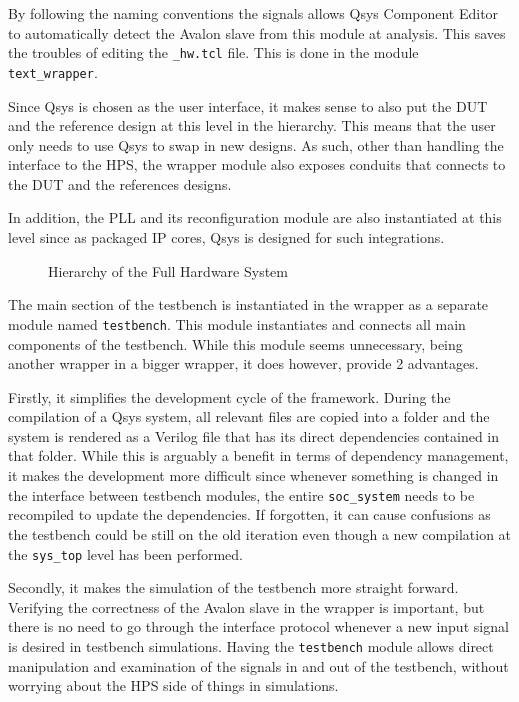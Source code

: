 By following the naming conventions  the signals allows Qsys Component Editor to automatically detect the Avalon slave from this module at analysis.
This saves the troubles of editing the \texttt{\_hw.tcl} file.
This is done in the module \texttt{text\_wrapper}.

Since Qsys is chosen as the user interface, it makes sense to also put the DUT and the reference design at this level in the hierarchy.
This means that the user only needs to use Qsys to swap in new designs.
As such, other than handling the interface to the HPS, the wrapper module also exposes conduits that connects to the DUT and the references designs.

In addition, the PLL and its reconfiguration module are also instantiated at this level since as packaged IP cores, Qsys is designed for such integrations.

\begin{figure}[H]
  \centering
  
  \caption{Hierarchy of the Full Hardware System}
  \label{Hierarchy}
\end{figure}

The main section of the testbench is instantiated in the wrapper as a separate module named \texttt{testbench}.
This module instantiates and connects all main components of the testbench.
While this module seems unnecessary, being another wrapper in a bigger wrapper, it does however, provide 2 advantages.

Firstly, it simplifies the development cycle of the framework.
During the compilation of a Qsys system, all relevant files are copied into a folder and the system is rendered as a Verilog file that has its direct dependencies contained in that folder.
While this is arguably a benefit in terms of dependency management, it makes the development more difficult since whenever something is changed in the interface between testbench modules, the entire \texttt{soc\_system} needs to be recompiled to update the dependencies.
If forgotten, it can cause confusions as the testbench could be still on the old iteration even though a new compilation at the \texttt{sys\_top} level has been performed.

Secondly, it makes the simulation of the testbench more straight forward.
Verifying the correctness of the Avalon slave in the wrapper is important, but there is no need to go through the interface protocol whenever a new input signal is desired in testbench simulations.
Having the \texttt{testbench} module allows direct manipulation and examination of the signals in and out of the testbench, without worrying about the HPS side of things in simulations.

